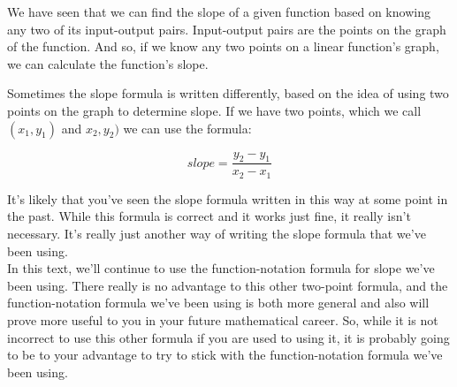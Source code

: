 \bigskip

We have seen that we can find the slope of a given function based on knowing any two of its input-output pairs. Input-output pairs are the points on the graph of the function. And so, if we know any two points on a linear function’s graph, we can calculate the function’s slope.



\bigskip

Sometimes the slope formula is written differently, based on the idea of using two points on the graph to determine slope. If we have two points, which we call $(x_1,y_1)$ and $x_2,y_2)$ we can use the formula:

\begin{equation*}
	slope=\frac{y_2-y_1}{x_2-x_1}
\end{equation*}

It’s likely that you’ve seen the slope formula written in this way at some point in the past. While this formula is correct and it works just fine, it really isn’t necessary. It’s really just another way of writing the slope formula that we’ve been using.\\

In this text, we’ll continue to use the function-notation formula for slope we’ve been using. There really is no advantage to this other two-point formula, and the function-notation formula we’ve been using is both more general and also will prove more useful to you in your future mathematical career. So, while it is not incorrect to use this other formula if you are used to using it, it is probably going to be to your advantage to try to stick with the function-notation formula we’ve been using.

%
%

